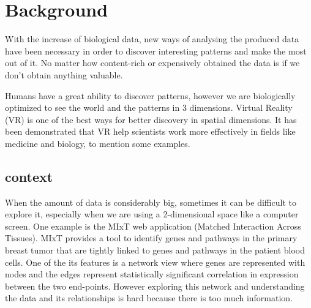 \section{Background}
With the increase of biological data, new ways of analysing the produced data have been necessary in order to discover interesting patterns  and make the most out of it. No matter how content-rich or expensively obtained the data is if we don’t obtain anything valuable.

Humans have a great ability to discover patterns, however we are biologically optimized to see the world and the patterns in 3 dimensions. Virtual Reality (VR) is one of the best ways for better discovery in spatial dimensions. It has been demonstrated that VR help scientists work more effectively in fields like medicine \cite{Laver11}\cite{xia_ip_samman_wong_gateno_wang_yeung_kot_tideman_2001} and biology\cite{10.1093/bioinformatics/bti581}, to mention some examples.

\subsection{context}
When the amount of data is considerably big, sometimes it can be difficult to explore it, especially when we are using a 2-dimensional space like a computer screen. One example is the MIxT web application (Matched Interaction Across Tissues)\cite{fjukstad_dumeaux_olsen_lund_hallett_bongo_2017}\cite{dumeaux_fjukstad_interactions_tumor_blood}. MIxT provides a tool to identify genes and pathways in the primary breast tumor that are tightly linked to genes and pathways in the patient blood cells\cite{dumeaux_fjukstad_interactions_tumor_blood}. One of the its features is a network view where genes are represented with nodes and the edges represent statistically significant correlation in expression between the two end-points. However exploring this network and understanding the data and its relationships is hard because there is too much information.

